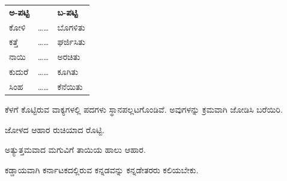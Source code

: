 \vspace{5pt plus 4pt minus 1pt}
\begin{center}
{\renewcommand{\arraystretch}{1.24}\setlength{\tabcolsep}{10pt}
\begin{tabular}{l c l}
\textbf{ಅ-ಪಟ್ಟಿ} & \hspace{12mm} & \textbf{ಬ-ಪಟ್ಟಿ} \\[3pt]
ಕೋಳಿ & \ldots\ldots & ಬೊಗಳಿತು \\
ಕತ್ತೆ & \ldots\ldots & ಘರ್ಜಿಸಿತು \\
ನಾಯಿ & \ldots\ldots & ಅರಚಿತು \\
ಕುದುರೆ & \ldots\ldots & ಕೂಗಿತು \\
ಸಿಂಹ & \ldots\ldots & ಕೆನೆಯಿತು \\
\end{tabular}}
\end{center}
\vspace{5pt plus 4pt minus 1pt}

\vspace{2.5pt plus 3pt minus 0.5pt}\noindent\hspace*{1.2em}\hspace{0.55em}ಕೆಳಗೆ ಕೊಟ್ಟಿರುವ ವಾಕ್ಯಗಳಲ್ಲಿ ಪದಗಳು ಸ್ಥಾನಪಲ್ಲಟಗೊಂಡಿವೆ. ಅವುಗಳನ್ನು ಕ್ರಮವಾಗಿ ಜೋಡಿಸಿ ಬರೆಯಿರಿ.\par

\vspace{2.5pt plus 3pt minus 0.5pt}\noindent\hspace*{1.2em}\hspace{0.55em}ಜೋಳದ ಆಹಾರ ರುಚಿಯಾದ ರೊಟ್ಟಿ.\par

\vspace{2.5pt plus 3pt minus 0.5pt}\noindent\hspace*{1.2em}\hspace{0.55em}ಅತ್ಯುತ್ತಮವಾದ ಮಗುವಿಗೆ ತಾಯಿಯ ಹಾಲು ಆಹಾರ.\par

\vspace{2.5pt plus 3pt minus 0.5pt}\noindent\hspace*{1.2em}\hspace{0.55em}ಕಡ್ಡಾಯವಾಗಿ ಕರ್ನಾಟಕದಲ್ಲಿರುವ ಕನ್ನಡವನ್ನು ಕನ್ನಡೇತರರು ಕಲಿಯಬೇಕು.\par
